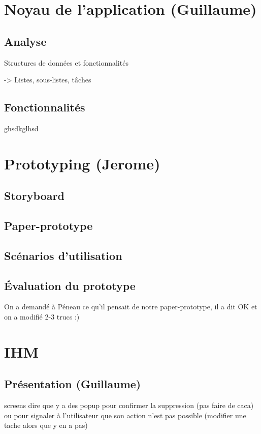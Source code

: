 \chapter{Noyau de l'application (Guillaume)}

	\section{Analyse}

		Structures de données et fonctionnalités
	
		-> Listes, sous-listes, tâches
		
	\section{Fonctionnalités}
	
		ghsdkglhsd
		
		


\chapter{Prototyping (Jerome)}

	\section{Storyboard}
	
	
	\section{Paper-prototype}
	

	\section{Scénarios d'utilisation}

	
	
	\section{Évaluation du prototype}
		On a demandé à Péneau ce qu'il pensait de notre paper-prototype, il a dit OK et on a modifié 2-3 trucs :)
		


\chapter{IHM}
	
	\section{Présentation (Guillaume)}
		screens
		dire que y a des popup pour confirmer la suppression (pas faire de caca) ou pour signaler à l'utilisateur que son action n'est pas possible (modifier une tache alors que y en a pas)
	
